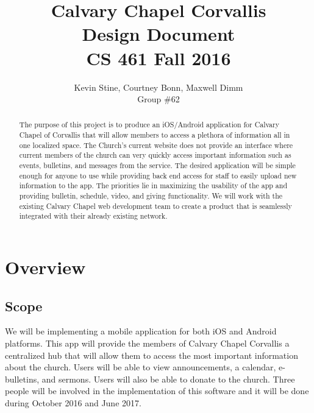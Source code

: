 \documentclass[letterpaper,10pt,draftclsnofoot,onecolumn,titlepage]{IEEEtran}
\def\name{Kevin Stine, Courtney Bonn, Maxwell Dimm}
\def\team{Calvary Chapel Corvallis}
\def\grp{Group \#62}
\begin{document}
	\title{\huge \team \\ Design Document \\ CS 461 Fall 2016}
	\author{\large \name \\ \grp}



	\maketitle


		\begin{abstract}The purpose of this project is to produce an iOS/Android application for Calvary Chapel of Corvallis that will allow members to access a plethora of information all in one localized space.
		The Church's current website does not provide an interface where current members of the church can very quickly access important information such as events, bulletins, and messages from the service.
		The desired application will be simple enough for anyone to use while providing back end access for staff to easily upload new information to the app.
		The priorities lie in maximizing the usability of the app and providing bulletin, schedule, video, and giving functionality.
		We will work with the existing Calvary Chapel web development team to create a product that is seamlessly integrated with their already existing network.
		\end{abstract}


	\clearpage

	\tableofcontents

	\clearpage

	\section{Overview}

		\subsection{Scope}
			We will be implementing a mobile application for both iOS and Android platforms.
			This app will provide the members of Calvary Chapel Corvallis a centralized hub that will allow them to access the most important information about the church.
			Users will be able to view announcements, a calendar, e-bulletins, and sermons.
			Users will also be able to donate to the church.
			Three people will be involved in the implementation of this software and it will be done during October 2016 and June 2017.
\end{document}
